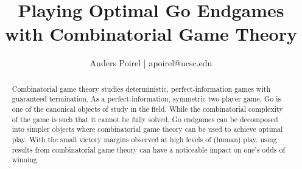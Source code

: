 \documentclass{article}[12pt]
\title{
    Playing Optimal Go Endgames with Combinatorial Game Theory \\
    \large
}
\date{}
\author{Anders Poirel | apoirel@ucsc.edu}
\begin{document}
    
\maketitle

\begin{abstract}
    Combinatorial game theory studies deterministic, perfect-information 
    games with guaranteed termination. As a perfect-information, symmetric 
    two-player game, Go is one of the canonical objects of study in the field.
    While the combinatorial complexity of the game is such that it cannot be fully solved,
    Go endgames can be decomposed into simpler objects where combinatorial game theory can 
    be used to achieve optimal play. With the small victory margins observed at high
    levels of (human) play, using results from combinatorial game theory can have a 
    noticeable impact on one's odds of winning 
\end{abstract}
\end{document}
